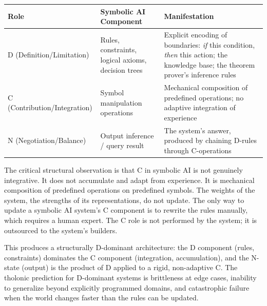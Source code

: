 \documentclass[
  11pt,
  letterpaper,
]{article}
\begin{document}
\begin{longtable}[]{@{}
  >{\raggedright\arraybackslash}p{}
  >{\raggedright\arraybackslash}p{}
  >{\raggedright\arraybackslash}p{}@{}}
\toprule\noalign{}
\begin{minipage}[b]{\linewidth}\raggedright
Role
\end{minipage} & \begin{minipage}[b]{\linewidth}\raggedright
Symbolic AI Component
\end{minipage} & \begin{minipage}[b]{\linewidth}\raggedright
Manifestation
\end{minipage} \\
\midrule\noalign{}
\endhead
\bottomrule\noalign{}
\endlastfoot
D (Definition/Limitation) & Rules, constraints, logical axioms, decision
trees & Explicit encoding of boundaries: \emph{if} this condition,
\emph{then} this action; the knowledge base; the theorem prover's
inference rules \\
C (Contribution/Integration) & Symbol manipulation operations &
Mechanical composition of predefined operations; no adaptive integration
of experience \\
N (Negotiation/Balance) & Output inference / query result & The system's
answer, produced by chaining D-rules through C-operations \\
\end{longtable}

The critical structural observation is that C in symbolic AI is not
genuinely integrative. It does not accumulate and adapt from experience.
It is mechanical composition of predefined operations on predefined
symbols. The weights of the system, the strengths of its
representations, do not update. The only way to update a symbolic AI
system's C component is to rewrite the rules manually, which requires a
human expert. The C role is not performed by the system; it is
outsourced to the system's builders.

This produces a structurally D-dominant architecture: the D component
(rules, constraints) dominates the C component (integration,
accumulation), and the N-state (output) is the product of D applied to a
rigid, non-adaptive C. The tholonic prediction for D-dominant systems is
brittleness at edge cases, inability to generalize beyond explicitly
programmed domains, and catastrophic failure when the world changes
faster than the rules can be updated.
\end{document}
